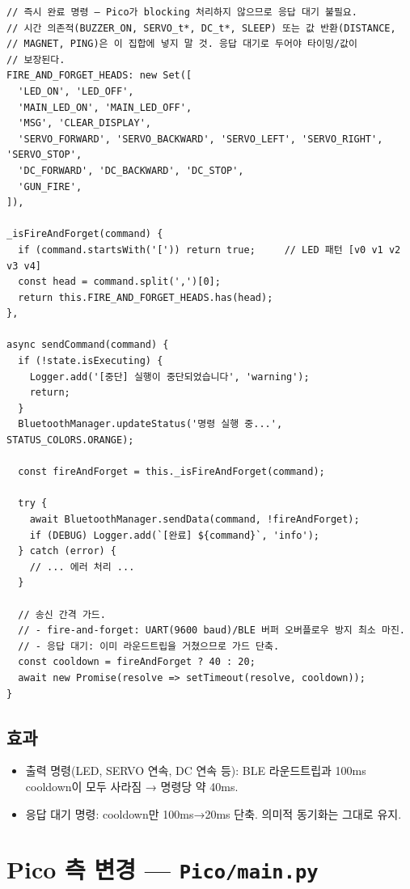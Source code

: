 \documentclass[11pt, oneside]{article}
\begin{document}
\begin{verbatim}
// 즉시 완료 명령 — Pico가 blocking 처리하지 않으므로 응답 대기 불필요.
// 시간 의존적(BUZZER_ON, SERVO_t*, DC_t*, SLEEP) 또는 값 반환(DISTANCE,
// MAGNET, PING)은 이 집합에 넣지 말 것. 응답 대기로 두어야 타이밍/값이
// 보장된다.
FIRE_AND_FORGET_HEADS: new Set([
  'LED_ON', 'LED_OFF',
  'MAIN_LED_ON', 'MAIN_LED_OFF',
  'MSG', 'CLEAR_DISPLAY',
  'SERVO_FORWARD', 'SERVO_BACKWARD', 'SERVO_LEFT', 'SERVO_RIGHT', 'SERVO_STOP',
  'DC_FORWARD', 'DC_BACKWARD', 'DC_STOP',
  'GUN_FIRE',
]),

_isFireAndForget(command) {
  if (command.startsWith('[')) return true;     // LED 패턴 [v0 v1 v2 v3 v4]
  const head = command.split(',')[0];
  return this.FIRE_AND_FORGET_HEADS.has(head);
},

async sendCommand(command) {
  if (!state.isExecuting) {
    Logger.add('[중단] 실행이 중단되었습니다', 'warning');
    return;
  }
  BluetoothManager.updateStatus('명령 실행 중...', STATUS_COLORS.ORANGE);

  const fireAndForget = this._isFireAndForget(command);

  try {
    await BluetoothManager.sendData(command, !fireAndForget);
    if (DEBUG) Logger.add(`[완료] ${command}`, 'info');
  } catch (error) {
    // ... 에러 처리 ...
  }

  // 송신 간격 가드.
  // - fire-and-forget: UART(9600 baud)/BLE 버퍼 오버플로우 방지 최소 마진.
  // - 응답 대기: 이미 라운드트립을 거쳤으므로 가드 단축.
  const cooldown = fireAndForget ? 40 : 20;
  await new Promise(resolve => setTimeout(resolve, cooldown));
}
\end{verbatim}

\subsection{효과}

\begin{itemize}
  \item 출력 명령(LED, SERVO 연속, DC 연속 등): BLE 라운드트립과 100ms
        cooldown이 모두 사라짐 → 명령당 약 40ms.
  \item 응답 대기 명령: cooldown만 100ms→20ms 단축. 의미적 동기화는
        그대로 유지.
\end{itemize}

\section{Pico 측 변경 — \texttt{Pico/main.py}}
\end{document}
